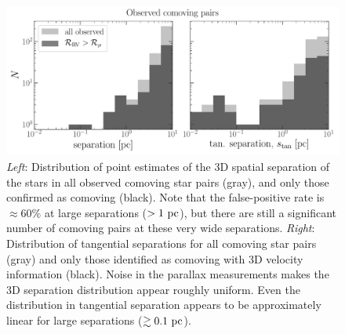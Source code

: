\documentclass[modern, letterpaper]{aastex61}
\begin{document}
\begin{figure}[htb]
  \begin{center}
    \includegraphics[width=\linewidth]{separation-hist.pdf}
  \end{center}
  \caption{%
    \emph{Left}: Distribution of point estimates of the 3D spatial separation of
    the stars in all observed comoving star pairs (gray), and only those
    confirmed as comoving (black).
    Note that the false-positive rate is $\approx 60\%$ at large separations
    ($>1~\mathrm{pc}$), but there are still a significant number of comoving pairs at
    these very wide separations.
    \emph{Right}: Distribution of tangential separations for all comoving star
    pairs (gray) and only those identified as comoving with 3D velocity
    information (black).
    Noise in the parallax measurements makes the 3D separation distribution
    appear roughly uniform.
    Even the distribution in tangential separation appears to be approximately
    linear for large separations ($\gtrsim 0.1~\mathrm{pc}$).
    \label{fig:separation}}
\end{figure}
\end{document}
